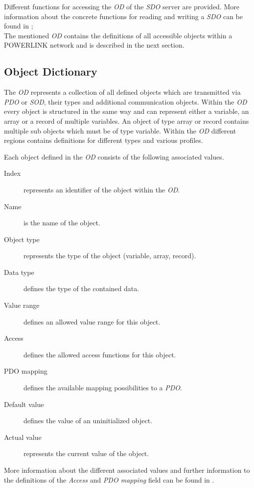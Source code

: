 Different functions for accessing the \emph{OD} of the \emph{SDO} server are provided.
More information about the concrete functions for reading and writing a \emph{SDO} can be found in \cite[section 6.3.2.4.2]{epsg_epsg_2013};
\\

The mentioned \emph{OD} contains the definitions of all accessible objects within a POWERLINK network and is described in the next section.

\subsection{Object Dictionary}
\label{sec:oplk_powerlink_object_dictionary}
The \emph{OD} represents a collection of all defined objects which are transmitted via \emph{PDO} or \emph{SOD}, their types and additional communication objects.
Within the \emph{OD} every object is structured in the same way and can represent either a variable, an array or a record of multiple variables.
An object of type array or record contains multiple sub objects which must be of type variable.
Within the \emph{OD} different regions contains definitions for different types and various profiles. \cite[section 2.2.2]{epsg_epsg_2013}

Each object defined in the \emph{OD} consists of the following associated values.

\begin{description}
    \item[Index] represents an identifier of the object within the \emph{OD}.
    \item[Name] is the name of the object.
    \item[Object type] represents the type of the object (variable, array, record).
    \item[Data type] defines the type of the contained data.
    \item[Value range] defines an allowed value range for this object.
    \item[Access] defines the allowed access functions for this object.
    \item[PDO mapping] defines the available mapping possibilities to a \emph{PDO}.
    \item[Default value] defines the value of an uninitialized object.
    \item[Actual value] represents the current value of the object.
\end{description}

More information about the different associated values and further information to the definitions of the \emph{Access} and \emph{PDO mapping} field can be found in \cite{openpowerlink_od_object}.
\\

